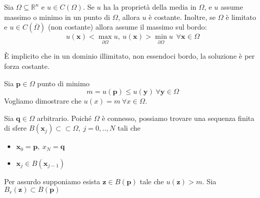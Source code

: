 \documentclass[10pt,a4paper,twoside,openright]{book}
\newcommand{\x}{\mathbf{x}}
\newcommand{\y}{\mathbf{y}}
\begin{document}
\begin{theorem}
	\label{thm:principio-di-massimo-armoniche}
	Sia $\Omega \subseteq \mathbb{R}^{n}$ e $u\in C(\Omega)$. Se $u$ ha la proprietà della media in $\Omega $, e $u$ assume massimo o minimo in un punto di $\Omega $, allora $u$ è costante. Inoltre, se $\Omega $ è limitato e $u\in C(\overline{\Omega })$ (non costante) allora assume il massimo sul bordo:
	\begin{equation*}
		u(\x) < \max_{\partial \Omega } u,\ u(\x)  >\min_{\partial \Omega } u\ \ \forall \x\in \Omega 
	\end{equation*}
\end{theorem}
È implicito che in un dominio illimitato, non essendoci bordo, la soluzione è per forza costante.
\begin{dimostrazione}
	Sia $\mathbf{p}\in \Omega $ punto di minimo
	\begin{equation*}
		m=u(\mathbf{p}) \leqslant u(\y) \ \forall \y\in \Omega 
	\end{equation*}
	Vogliamo dimostrare che $u(x) =m\ \forall x\in \Omega $.
	
	Sia $\mathbf{q}\in \Omega $ arbitrario. Poiché $\Omega $ è connesso, possiamo trovare una sequenza finita di sfere $B(\x_{j}) \subset \subset \Omega,\ j=0,..,N$ tali che
	\begin{itemize}
		\item $\x_{0} =\mathbf{p},\ x_{N} =\mathbf{q}$
		\item $\x_{j} \in B(\x_{j-1})$
	\end{itemize}
	Per assurdo supponiamo esista $\mathbf{z}\in B(\mathbf{p})$ tale che $u(\mathbf{z})  >m$. Sia $B_{r}(\mathbf{z}) \subset B(\mathbf{p})$
	
	\begin{figure}[H]
		\centering

		\begin{tikzpicture}[x=0.75pt,y=0.75pt,yscale=-1,xscale=1]


\end{tikzpicture}
\end{figure}
\end{dimostrazione}
\end{document}
